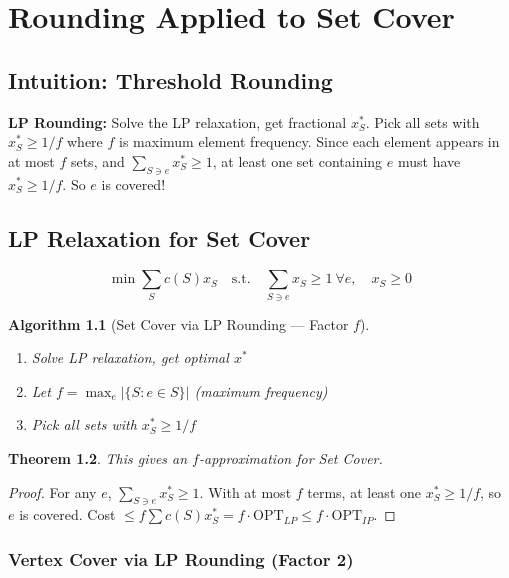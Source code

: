 \documentclass[11pt,oneside]{book}
\newtheorem{theorem}{Theorem}[chapter]
\newtheorem{algorithmdef}[theorem]{Algorithm}
\newcommand{\OPT}{\mathrm{OPT}}
\begin{document}
\chapter{Rounding Applied to Set Cover}
\label{ch:setcover_rounding}

\section{Intuition: Threshold Rounding}

\begin{intuitionbox}
\textbf{LP Rounding:} Solve the LP relaxation, get fractional $x^*_S$. Pick all sets with $x^*_S \geq 1/f$ where $f$ is maximum element frequency. Since each element appears in at most $f$ sets, and $\sum_{S \ni e} x^*_S \geq 1$, at least one set containing $e$ must have $x^*_S \geq 1/f$. So $e$ is covered!
\end{intuitionbox}

\section{LP Relaxation for Set Cover}

\[
\min \sum_S c(S) x_S \quad \text{s.t.} \quad \sum_{S \ni e} x_S \geq 1 \ \forall e, \quad x_S \geq 0
\]

\begin{algorithmdef}[Set Cover via LP Rounding — Factor $f$]
\begin{enumerate}
    \item Solve LP relaxation, get optimal $x^*$
    \item Let $f = \max_e |\{S : e \in S\}|$ (maximum frequency)
    \item Pick all sets with $x^*_S \geq 1/f$
\end{enumerate}
\end{algorithmdef}

\begin{theorem}
This gives an $f$-approximation for Set Cover.
\end{theorem}
\begin{proof}
For any $e$, $\sum_{S \ni e} x^*_S \geq 1$. With at most $f$ terms, at least one $x^*_S \geq 1/f$, so $e$ is covered. Cost $\leq f \sum c(S) x^*_S = f \cdot \OPT_{LP} \leq f \cdot \OPT_{IP}$.
\end{proof}

\subsection{Vertex Cover via LP Rounding (Factor 2)}
\end{document}
